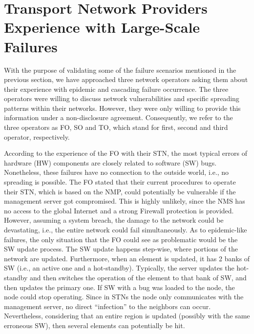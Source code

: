 \documentclass[10pt,draftclsnofoot,onecolumn,journal]{IEEEtran}
\begin{document}
\section{Transport Network Providers Experience with Large-Scale Failures\label{providers}}


With the purpose of validating some of the failure scenarios mentioned in the previous section, we have approached three network operators asking them about their experience with epidemic and cascading failure occurrence. The three operators were willing to discuss network vulnerabilities and specific spreading patterns within their networks. However, they were only willing to provide this information under a non-disclosure agreement. Consequently, we refer to the three operators as FO, SO and TO, which stand for first, second and third operator, respectively.





According to the experience of the FO with their STN, the most typical errors of hardware (HW) components are closely related to software (SW) bugs. Nonetheless, these failures have no connection to the outside world, i.e., no spreading is possible. The FO stated that their current procedures to operate their STN, which is based on the NMP, could potentially be vulnerable if the management server got compromised. This is highly unlikely, since the NMS has no access to the global Internet and a strong Firewall protection is provided. However, assuming a system breach, the damage to the network could be devastating, i.e., the entire network could fail simultaneously. As to epidemic-like failures, the only situation that the FO could see as problematic would be the SW update process. The SW update happens step-wise, where portions of the network are updated. Furthermore, when an element is updated, it has 2 banks of SW (i.e., an active one and a hot-standby). Typically, the server updates the hot-standby and then switches the operation of the element to that bank of SW, and then updates the primary one. If SW with a bug was loaded to the node, the node could stop operating. Since in STNs the node only communicates with the management server, no direct ``infection'' to the neighbors can occur. Nevertheless, considering that an entire region is updated (possibly with the same erroneous SW), then several elements can potentially be hit.
\end{document}
